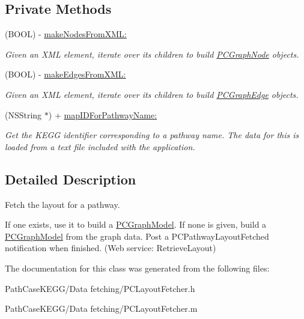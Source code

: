 \subsection*{Private Methods}
\begin{DoxyCompactItemize}
\item 
\hypertarget{interface_p_c_layout_fetcher_a96b379f4d241126dddaf8b1b5be8b948}{
(BOOL) -\/ \hyperlink{interface_p_c_layout_fetcher_a96b379f4d241126dddaf8b1b5be8b948}{makeNodesFromXML:}}
\label{interface_p_c_layout_fetcher_a96b379f4d241126dddaf8b1b5be8b948}

\begin{DoxyCompactList}\small\item\em Given an XML element, iterate over its children to build \hyperlink{interface_p_c_graph_node}{PCGraphNode} objects. \end{DoxyCompactList}\item 
\hypertarget{interface_p_c_layout_fetcher_af042ff1048b356d820e20330cbac861f}{
(BOOL) -\/ \hyperlink{interface_p_c_layout_fetcher_af042ff1048b356d820e20330cbac861f}{makeEdgesFromXML:}}
\label{interface_p_c_layout_fetcher_af042ff1048b356d820e20330cbac861f}

\begin{DoxyCompactList}\small\item\em Given an XML element, iterate over its children to build \hyperlink{interface_p_c_graph_edge}{PCGraphEdge} objects. \end{DoxyCompactList}\item 
\hypertarget{interface_p_c_layout_fetcher_a759af44edd2f33f09d0c849204506557}{
(NSString $\ast$) + \hyperlink{interface_p_c_layout_fetcher_a759af44edd2f33f09d0c849204506557}{mapIDForPathwayName:}}
\label{interface_p_c_layout_fetcher_a759af44edd2f33f09d0c849204506557}

\begin{DoxyCompactList}\small\item\em Get the KEGG identifier corresponding to a pathway name. The data for this is loaded from a text file included with the application. \end{DoxyCompactList}\end{DoxyCompactItemize}


\subsection{Detailed Description}
Fetch the layout for a pathway. 

If one exists, use it to build a \hyperlink{interface_p_c_graph_model}{PCGraphModel}. If none is given, build a \hyperlink{interface_p_c_graph_model}{PCGraphModel} from the graph data. Post a {\ttfamily PCPathwayLayoutFetched} notification when finished. (Web service: {\ttfamily RetrieveLayout}) 

The documentation for this class was generated from the following files:\begin{DoxyCompactItemize}
\item 
PathCaseKEGG/Data fetching/PCLayoutFetcher.h\item 
PathCaseKEGG/Data fetching/PCLayoutFetcher.m\end{DoxyCompactItemize}
